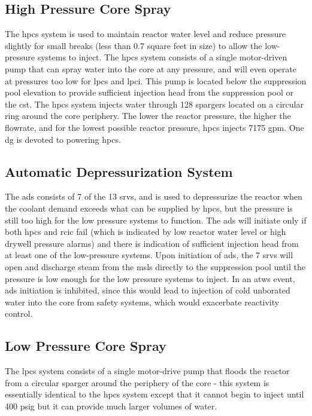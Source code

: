 \documentclass[10pt]{article}
\begin{document}
\subsection{High Pressure Core Spray}
The \gls{hpcs} system is used to maintain reactor water level and reduce pressure slightly for small breaks (less than 0.7 square feet in size) to allow the low-pressure systems to inject. The \gls{hpcs} system consists of a single motor-driven pump that can spray water into the core at any pressure, and will even operate at pressures too low for \gls{lpcs} and \gls{lpci}. This pump is located below the suppression pool elevation to provide sufficient injection head from the suppression pool or the \gls{cst}. The \gls{hpcs} system injects water through 128 spargers located on a circular ring around the core periphery. The lower the reactor pressure, the higher the flowrate, and for the lowest possible reactor pressure, \gls{hpcs} injects 7175 gpm. One \gls{dg} is devoted to powering \gls{hpcs}. 

\subsection{Automatic Depressurization System}
The \gls{ads} consists of 7 of the 13 \gls{srv}s, and is used to depressurize the reactor when the coolant demand exceeds what can be supplied by \gls{hpcs}, but the pressure is still too high for the low pressure systems to function. The \gls{ads} will initiate only if both \gls{hpcs} and \gls{rcic} fail (which is indicated by low reactor water level or high drywell pressure alarms) and there is indication of sufficient injection head from at least one of the low-pressure systems. Upon initiation of \gls{ads}, the 7 \gls{srv}s will open and discharge steam from the \gls{msl}s directly to the suppression pool until the pressure is low enough for the low pressure systems to inject. In an \gls{atws} event, \gls{ads} initiation is inhibited, since this would lead to injection of cold unborated water into the core from safety systems, which would exacerbate reactivity control. 

\subsection{Low Pressure Core Spray}
The \gls{lpcs} system consists of a single motor-drive pump that floods the reactor from a circular sparger around the periphery of the core - this system is essentially identical to the \gls{hpcs} system except that it cannot begin to inject until 400 psig but it can provide much larger volumes of water. 
\end{document}
